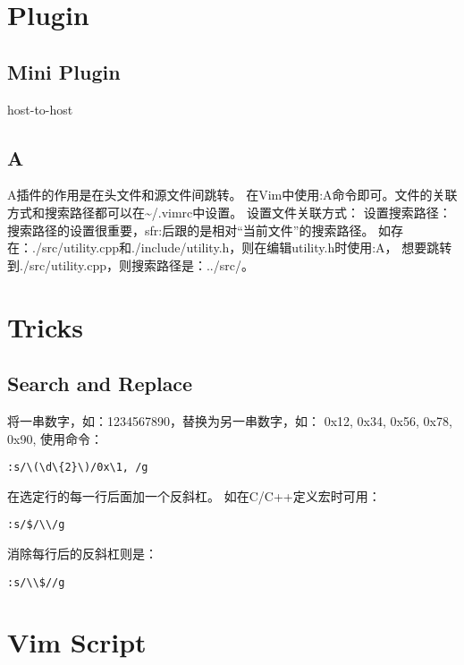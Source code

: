 \section{Plugin}

\subsection{Mini Plugin}host-to-host


\subsection{A}
A插件的作用是在头文件和源文件间跳转。
在Vim中使用:A命令即可。文件的关联方式和搜索路径都可以在\~{}/.vimrc中设置。
设置文件关联方式：
设置搜索路径：
搜索路径的设置很重要，sfr:后跟的是相对“当前文件”的搜索路径。
如存在：./src/utility.cpp和./include/utility.h，则在编辑utility.h时使用:A，
想要跳转到./src/utility.cpp，则搜索路径是：../src/。

\section{Tricks}
\subsection{Search and Replace}
将一串数字，如：1234567890，替换为另一串数字，如：
0x12, 0x34, 0x56, 0x78, 0x90, 
使用命令：
\begin{lstlisting}
:s/\(\d\{2}\)/0x\1, /g
\end{lstlisting}

在选定行的每一行后面加一个反斜杠。
如在C/C++定义宏时可用：
\begin{lstlisting}
:s/$/\\/g
\end{lstlisting}
消除每行后的反斜杠则是：
\begin{lstlisting}
:s/\\$//g
\end{lstlisting}

\section{Vim Script} \label{language-vim-script}
